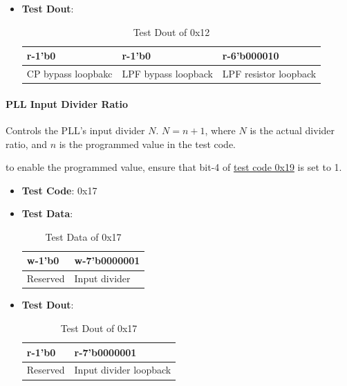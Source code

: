 \documentclass[main\_\_EN.tex]{subfiles}
\begin{document}
\begin{itemize}
\begin{itemize}
\begin{itemize}
                \end{itemize}
        \end{itemize}
    \item \textbf{Test Dout}:
        \begin{longtable}{ |p{4cm}|p{4cm}|p{4cm}|}
            \caption{Test Dout of 0x12}
            \label{tab:test-dout-0x12} \\
            \hline
            \rowcolor{lightgray}
            \textbf{r-1'b0} & \textbf{r-1'b0} & \textbf{r-6'b000010} \\ \hline
            CP bypass loopbakc & LPF bypass loopback & LPF resistor loopback \\ \hline
        \end{longtable}
\end{itemize}


\paragraph{PLL Input Divider Ratio}
\label{sec:test-code-0x17}
Controls the PLL's input divider $N$. $N = n + 1$, where $N$ is the actual divider ratio, and $n$ is the programmed value in the test code.

to enable the programmed value, ensure that bit-4 of \hyperref[sec:test-code-0x19]{test code 0x19} is set to 1.

\begin{itemize}
    \item \textbf{Test Code}: 0x17
    \item \textbf{Test Data}: 
        \begin{longtable}{ |p{6cm}|p{6cm}|}
            \caption{Test Data of 0x17}
            \label{tab:test-data-0x17} \\
            \hline
            \rowcolor{lightgray}
            \textbf{w-1'b0} & \textbf{w-7'b0000001} \\ \hline
            Reserved & Input divider  \\ \hline
        \end{longtable}
    \item \textbf{Test Dout}:
        \begin{longtable}{ |p{6cm}|p{6cm}|}
            \caption{Test Dout of 0x17}
            \label{tab:test-dout-0x17} \\
            \hline
            \rowcolor{lightgray}
            \textbf{r-1'b0} & \textbf{r-7'b0000001} \\ \hline
            Reserved & Input divider loopback \\ \hline
        \end{longtable}
\end{itemize}
\end{document}
